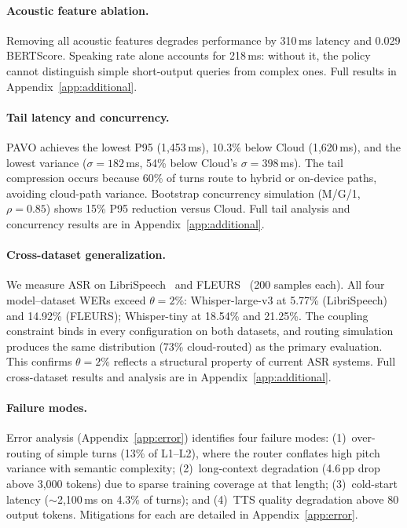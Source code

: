 \documentclass{article}
\begin{document}
\paragraph{Acoustic feature ablation.} Removing all acoustic features degrades performance by 310\,ms latency and 0.029 BERTScore. Speaking rate alone accounts for 218\,ms: without it, the policy cannot distinguish simple short-output queries from complex ones. Full results in Appendix~\ref{app:additional}.

\paragraph{Tail latency and concurrency.}
\label{sec:concurrency}
PAVO achieves the lowest P95 (1{,}453\,ms), 10.3\% below Cloud (1{,}620\,ms), and the lowest variance ($\sigma=182$\,ms, 54\% below Cloud's $\sigma=398$\,ms). The tail compression occurs because 60\% of turns route to hybrid or on-device paths, avoiding cloud-path variance. Bootstrap concurrency simulation (M/G/1, $\rho=0.85$) shows 15\% P95 reduction versus Cloud. Full tail analysis and concurrency results are in Appendix~\ref{app:additional}.

\paragraph{Cross-dataset generalization.}
\label{sec:cross_dataset_full}
We measure ASR on LibriSpeech~\citep{panayotov2015librispeech} and FLEURS~\citep{conneau2023fleurs} (200 samples each). All four model--dataset WERs exceed $\theta=2\%$: Whisper-large-v3 at 5.77\% (LibriSpeech) and 14.92\% (FLEURS); Whisper-tiny at 18.54\% and 21.25\%. The coupling constraint binds in every configuration on both datasets, and routing simulation produces the same distribution (73\% cloud-routed) as the primary evaluation. This confirms $\theta=2\%$ reflects a structural property of current ASR systems. Full cross-dataset results and analysis are in Appendix~\ref{app:additional}.

\paragraph{Failure modes.}
\label{sec:failure_modes}
Error analysis (Appendix~\ref{app:error}) identifies four failure modes: (1)~over-routing of simple turns (13\% of L1--L2), where the router conflates high pitch variance with semantic complexity; (2)~long-context degradation (4.6\,pp drop above 3{,}000 tokens) due to sparse training coverage at that length; (3)~cold-start latency ($\sim$2{,}100\,ms on 4.3\% of turns); and (4)~TTS quality degradation above 80 output tokens. Mitigations for each are detailed in Appendix~\ref{app:error}.
\end{document}
